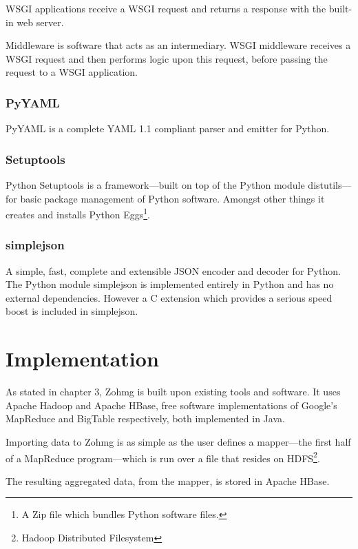 \documentclass[a4paper,10pt]{book}
\begin{document}
WSGI applications receive a WSGI request and returns a response with the
built-in web server.

Middleware is software that acts as an intermediary. WSGI middleware
receives a WSGI request and then performs logic upon this request, before
passing the request to a WSGI application. \cite{paste}


\subsection{PyYAML}

PyYAML is a complete YAML 1.1 compliant parser and emitter for Python.
\cite{pyyaml}


\subsection{Setuptools}

Python Setuptools is a framework---built on top of the Python module
distutils---for basic package management of Python software. Amongst other
things it creates and installs Python Eggs\footnote{A Zip file which
bundles Python software files.}. \cite{setuptools}


\subsection{simplejson}

A simple, fast, complete and extensible JSON encoder and decoder for
Python. The Python module simplejson is implemented entirely in Python and
has no external dependencies. However a C extension which provides a
serious speed boost is included in simplejson. \cite{simplejson}




\chapter{Implementation}

As stated in chapter 3, Zohmg is built upon existing tools and software.
It uses Apache Hadoop and Apache HBase, free software implementations of
Google's MapReduce and BigTable respectively, both implemented in Java.

Importing data to Zohmg is as simple as the user defines a mapper---the
first half of a MapReduce program---which is run over a file that resides
on HDFS\footnote{Hadoop Distributed Filesystem}.

The resulting aggregated data, from the mapper, is stored in Apache HBase.
\end{document}
